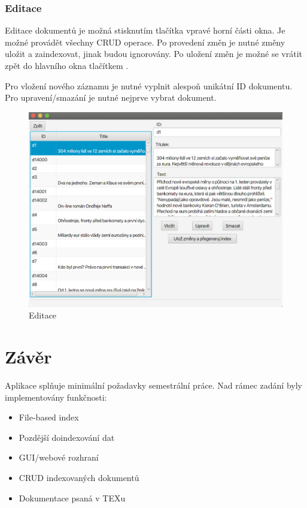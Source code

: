 \documentclass[12pt, a4paper]{article}
\begin{document}
\newpage
\subsubsection{Editace}
\noindent Editace dokumentů je možná stisknutím tlačítka  vpravé horní části okna. Je možné provádět všechny CRUD operace. Po provedení změn je nutné změny uložit a zaindexovat, jinak budou ignorovány. Po uložení změn je možné se vrátit zpět do hlavního okna tlačítkem .

Pro vložení nového záznamu je nutné vyplnit alespoň unikátní ID dokumentu. Pro upravení/smazání je nutné nejprve vybrat dokument.

\begin{figure}[H]
  \centering
  \includegraphics[scale=0.5]{img/edit.png}
  \caption{Editace}
\end{figure}
\newpage
\section{Závěr}
\noindent Aplikace splňuje minimální požadavky semestrální práce. Nad rámec zadání byly implementovány funkčnosti:

\begin{itemize}
	\item File-based index
	\item Pozdější doindexování dat
	\item GUI/webové rozhraní
	\item CRUD indexovaných dokumentů
	\item Dokumentace psaná v TEXu
\end{itemize}
\end{document}
